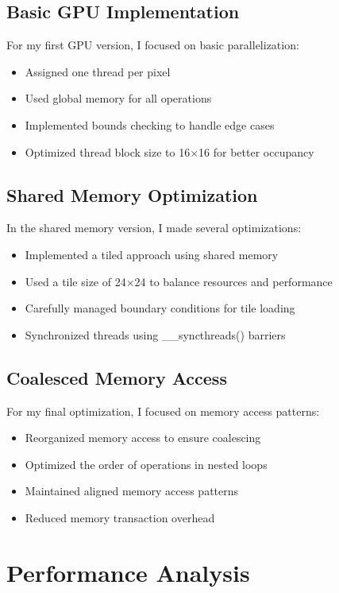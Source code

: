 \documentclass[12pt]{article}
\begin{document}
\subsection{Basic GPU Implementation}
For my first GPU version, I focused on basic parallelization:
\begin{itemize}
    \item Assigned one thread per pixel
    \item Used global memory for all operations
    \item Implemented bounds checking to handle edge cases
    \item Optimized thread block size to 16×16 for better occupancy
\end{itemize}

\subsection{Shared Memory Optimization}
In the shared memory version, I made several optimizations:
\begin{itemize}
    \item Implemented a tiled approach using shared memory
    \item Used a tile size of 24×24 to balance resources and performance
    \item Carefully managed boundary conditions for tile loading
    \item Synchronized threads using \_\_syncthreads() barriers
\end{itemize}

\subsection{Coalesced Memory Access}
For my final optimization, I focused on memory access patterns:
\begin{itemize}
    \item Reorganized memory access to ensure coalescing
    \item Optimized the order of operations in nested loops
    \item Maintained aligned memory access patterns
    \item Reduced memory transaction overhead
\end{itemize}

\section{Performance Analysis}
\end{document}
